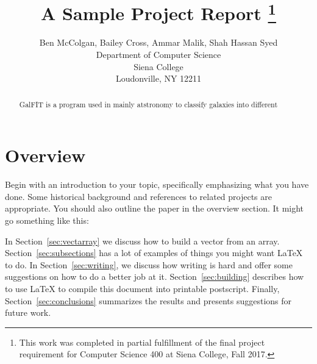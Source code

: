 \documentclass[12pt]{article}
\newcommand{\doublespace}{
  \protect\renewcommand\baselinestretch{1.5}
  \protect\normalsize
}
\begin{document}
\date{}

\title{A Sample Project Report
\footnote{This work was completed in partial fulfillment of the final
project requirement for Computer Science 400 at Siena College, Fall 2017.}}

\author{Ben McColgan, Bailey Cross, Ammar Malik, Shah Hassan Syed\\
Department of Computer Science\\
Siena College\\
Loudonville, NY  12211
}

\maketitle
\thispagestyle{empty}

\begin{abstract}
  GalFIT is a program used in mainly atstronomy to classify galaxies into
  different 
\end{abstract}

\doublespace

\section{Overview}
\label{sec:overview}

Begin with an introduction to your topic, specifically emphasizing
what you have done.  Some historical background and references to
related projects are appropriate.  You should also outline the paper
in the overview section.  It might go something like this:

In Section~\ref{sec:vectarray} we discuss how to build a vector from
an array.  Section~\ref{sec:subsections} has a lot of examples of
things you might want \LaTeX~\cite{lamport86} to do.  In
Section~\ref{sec:writing}, we discuss how writing is hard and offer
some suggestions on how to do a better job at it.
Section~\ref{sec:building} describes how to use \LaTeX{} to compile
this document into printable postscript.  Finally,
Section~\ref{sec:conclusions} summarizes the results and presents
suggestions for future work.
\end{document}
